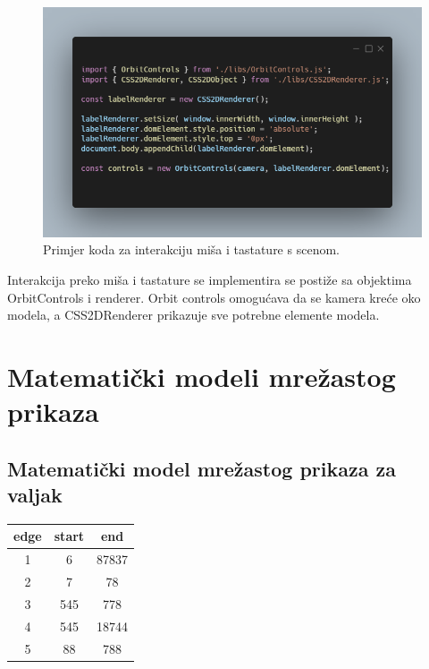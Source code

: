 \documentclass[a4paper,12pt]{article}
\begin{document}
\begin{figure}[ht]
    \centering
    \includegraphics[scale=0.5]{image/zadatak1_kontrole.png}
    \caption{Primjer koda za interakciju miša i tastature s scenom.}
\end{figure}

\pagebreak
Interakcija preko miša i tastature se implementira se postiže sa objektima OrbitControls i renderer. Orbit controls omogućava da se kamera kreće oko modela,
a CSS2DRenderer prikazuje sve potrebne elemente modela.


\section{Matematički modeli mrežastog prikaza}

\subsection{Matematički model mrežastog prikaza za valjak}
\begin{flushleft}
    \begin{tabular}{||c | c | c ||} 
     \hline
     edge & start & end \\ [0.5ex] 
     \hline\hline
     1 & 6 & 87837  \\ 
     \hline
     2 & 7 & 78  \\
     \hline
     3 & 545 & 778  \\
     \hline
     4 & 545 & 18744 \\
     \hline
     5 & 88 & 788  \\ [1ex] 
     \hline
    \end{tabular}
    \end{flushleft}


\newpage
\end{document}
